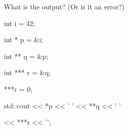 What is the output? (Or is it an error?)



\begin{consolethree}[escapeinside=||]

int i = 42;

int * p = &i;

int ** q = &p;

int *** r = &q;

***r = 0;



std::cout << *p << ' ' << **q << ' '

          << ***r << '\n'; 

\end{consolethree}

